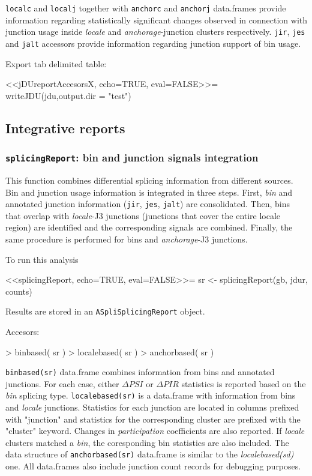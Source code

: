 \documentclass{article}
\begin{document}
\texttt{localc} and \texttt{localj} together with \texttt{anchorc} and \texttt{anchorj} data.frames provide information regarding statistically significant changes observed in connection with junction usage inside {\em locale} and {\em anchorage}-junction clusters respectively. \texttt{jir}, \texttt{jes} and \texttt{jalt} accessors provide information regarding junction support of bin usage.

Export tab delimited table:

 <<jDUreportAccesorsX, echo=TRUE, eval=FALSE>>=
writeJDU(jdu,output.dir = "test")


\subsection{Integrative reports} \label{sec:integration}

\subsubsection{\texttt{splicingReport}: bin and junction signals integration}

This function combines differential splicing information from different sources. Bin and junction usage information is integrated in three steps. First, {\em bin} and annotated junction information (\texttt{jir}, \texttt{jes}, \texttt{jalt}) are consolidated. Then, bins that overlap with {\em locale}-J3 junctions (junctions that cover the entire locale region) are identified and the corresponding signals are combined. Finally, the same procedure is performed for bins and {\em anchorage}-J3 junctions.

To run this analysis

 <<splicingReport, echo=TRUE, eval=FALSE>>=
sr      <- splicingReport(gb, 
                          jdur, 
                          counts)

Results are stored in an \texttt{ASpliSplicingReport} object.

Accesors:

\begin{Schunk}
\begin{Sinput}
>  binbased( sr )
>  localebased( sr )
>  anchorbased( sr )
\end{Sinput}
\end{Schunk}

\texttt{binbased(sr)} data.frame combines information from bins and annotated junctions. For each case, either $\Delta PSI$ or $\Delta PIR$ statistics is reported based on the {\em bin} splicing type. \texttt{localebased(sr)}  is a data.frame with information from bins and {\em locale} junctions. Statistics for each junction are located in columns prefixed with "junction" and statistics for the corresponding cluster are prefixed with the "cluster" keyword. Changes in {\em participation} coefficients are also reported. If {\em locale} clusters matched a {\em bin}, the coresponding bin statistics are also included. The data structure of \texttt{anchorbased(sr)} data.frame is similar to the {\em localebased(sd)} one. All data.frames also include junction count records for debugging purposes.
\end{document}
